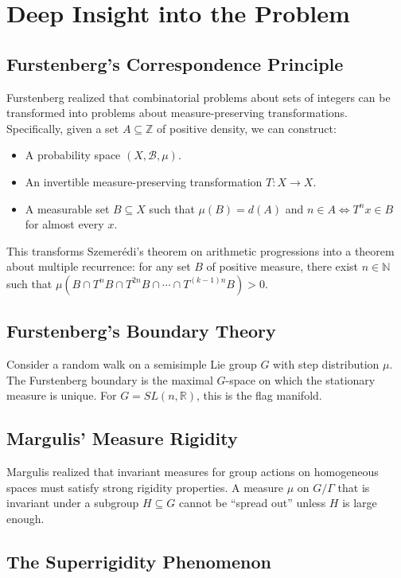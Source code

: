 \section{Deep Insight into the Problem}

\subsection{Furstenberg's Correspondence Principle}

Furstenberg realized that combinatorial problems about sets of integers can be transformed into problems about measure-preserving transformations. Specifically, given a set $A \subseteq \mathbb{Z}$ of positive density, we can construct:
\begin{itemize}
\item A probability space $(X,\mathcal{B},\mu)$.
\item An invertible measure-preserving transformation $T: X \to X$.
\item A measurable set $B \subseteq X$ such that $\mu(B) = d(A)$ and $n \in A \iff T^n x \in B$ for almost every $x$.
\end{itemize}

This transforms Szemer\'edi's theorem on arithmetic progressions into a theorem about multiple recurrence: for any set $B$ of positive measure, there exist $n \in \mathbb{N}$ such that $\mu(B \cap T^n B \cap T^{2n} B \cap \cdots \cap T^{(k-1)n} B) > 0$.

\subsection{Furstenberg's Boundary Theory}

Consider a random walk on a semisimple Lie group $G$ with step distribution $\mu$. The Furstenberg boundary is the maximal $G$-space on which the stationary measure is unique. For $G = SL(n,\mathbb{R})$, this is the flag manifold.

\subsection{Margulis' Measure Rigidity}

Margulis realized that invariant measures for group actions on homogeneous spaces must satisfy strong rigidity properties. A measure $\mu$ on $G/\Gamma$ that is invariant under a subgroup $H \subseteq G$ cannot be ``spread out'' unless $H$ is large enough.

\subsection{The Superrigidity Phenomenon}

